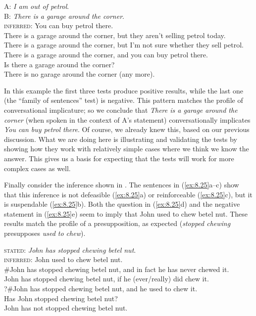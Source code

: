 \ea \label{ex:8.24}
A: \textit{I am out of petrol}.\\
B: \textit{There is a garage around the corner}.\\
\textsc{inferred}: You can buy petrol there.\\
\ea There is a garage around the corner, but they aren’t selling petrol today.\\
\ex There is a garage around the corner, but I’m not sure whether they sell petrol.\\
\ex There is a garage around the corner, and you can buy petrol there.\\
\ex Is there a garage around the corner?\\
\ex There is no garage around the corner (any more).
                       \z
\z


In this example the first three tests produce positive results, while the last one (the “family of sentences” test) is negative. This pattern matches the profile of conversational implicature; so we conclude that \textit{There is a garage around the corner} (when spoken in the context of A’s statement) conversationally implicates \textit{You can buy petrol there}. Of course, we already knew this, based on our previous discussion. What we are doing here is illustrating and validating the tests by showing how they work with relatively simple cases where we think we know the answer. This gives us a basis for expecting that the tests will work for more complex cases as well.



Finally consider the inference shown in . The sentences in (\ref{ex:8.25}a--c) show that this inference is not defeasible (\ref{ex:8.25}a) or reinforceable (\ref{ex:8.25}c), but it is suspendable (\ref{ex:8.25}b). Both the question in (\ref{ex:8.25}d) and the negative statement in (\ref{ex:8.25}e) seem to imply that John used to chew betel nut. These results match the profile of a presupposition, as expected (\textit{stopped chewing} presupposes \textit{used to chew}).


\ea \label{ex:8.25}
\textsc{stated}: \textit{John has stopped chewing betel nut}.\\
\textsc{inferred}: John used to chew betel nut.\\
\ea \#John has stopped chewing betel nut, and in fact he has never chewed it.\\
\ex John has stopped chewing betel nut, if he (ever/really) did chew it.\\
\ex ?\#John has stopped chewing betel nut, and he used to chew it.\\
\ex Has John stopped chewing betel nut?\\
\ex John has not stopped chewing betel nut.
                       \z
\z


